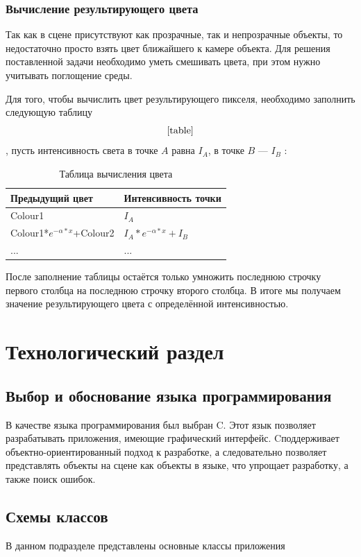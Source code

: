 \documentclass[14pt,a4paper]{extarticle}
\newcommand{\CS}{C\nolinebreak\hspace{-.05em}\raisebox{.6ex}{\scriptsize\bf \#}}
\begin{document}
		\subsubsection*{Вычисление результирующего цвета}
			Так как в сцене присутствуют как прозрачные, так и непрозрачные объекты, 
			то недостаточно просто взять цвет ближайшего к камере объекта. 
			Для решения поставленной задачи необходимо уметь смешивать цвета, 
			при этом нужно учитывать поглощение среды.

			Для того, чтобы вычислить цвет результирующего пикселя, 
			необходимо заполнить следующую таблицу \[\ref{table}\], 
			пусть интенсивность света в точке $A$ равна $I_A$, 
			в точке $B$ --- $I_B$ :
			\begin{table}[H]
				\caption{Таблица вычисления цвета}
				\label{table}
				\begin{center}
					\begin{tabular}{|p{7cm}|p{7cm}|}
						\hline
						Предыдущий цвет & Интенсивность точки \\ \hline
						Colour1 & $I_A$ \\ \hline
						Colour1*$e^{-\alpha*x}$+Colour2 & $I_A*e^{-\alpha*x}+I_B$ \\ \hline
						... & ... \\ \hline			
					\end{tabular}
				\end{center}
			\end{table}
			После заполнение таблицы остаётся только умножить последнюю строчку первого столбца на последнюю строчку второго столбца. 
			В итоге мы получаем значение результирующего цвета с определённой интенсивностью.
\clearpage			
\section{Технологический раздел}
	\subsection{Выбор и обоснование языка программирования}
		В качестве языка программирования был выбран \CS. 
		Этот язык позволяет разрабатывать приложения, имеющие графический интерфейс. 
		\CS поддерживает объектно-ориентированный подход к разработке, 
		а следовательно позволяет представлять объекты на сцене как объекты в языке, 
		что упрощает разработку, а также поиск ошибок.
	\subsection{Схемы классов}
		В данном подразделе представлены основные классы приложения
\end{document}
